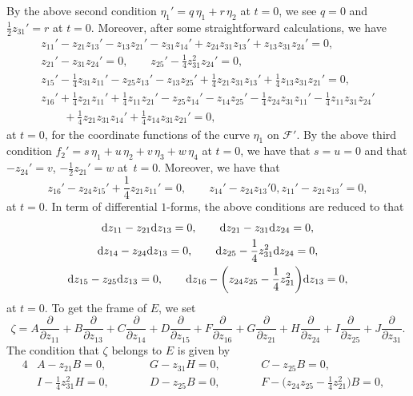 \documentclass[pdftex]{sigma}
\numberwithin{equation}{section}
\theoremstyle{definition}
\newcommand{\0}{\boldsymbol{0}}
\newcommand{\pa}{\partial}
\begin{document}
By the above second condition
$\eta_1' = q\,\eta_1 + r\,\eta_2$ at $t = 0$, we see $q = 0$ and $\frac{1}{2}z_{31}' = r$ at $t = 0$.
Moreover, after some straightforward calculations, we have
\begin{gather*}
z_{11}' - z_{21}z_{13}' - z_{13}z_{21}' - z_{31}z_{14}' + z_{24}z_{31}z_{13}' + z_{13}z_{31}z_{24}' = 0,
\\
z_{21}' - z_{31}z_{24}' = 0, \qquad z_{25}' - \frac{1}{4}z_{31}^2z_{24}' = 0,
\\
z_{15}' - \frac{1}{4}z_{31}z_{11}' - z_{25}z_{13}' - z_{13}z_{25}' + \frac{1}{4}z_{21}z_{31}z_{13}' +
\frac{1}{4}z_{13}z_{31}z_{21}' = 0,
\\
z_{16}' + \frac{1}{4}z_{21}z_{11}' + \frac{1}{4}z_{11}z_{21}' - z_{25}z_{14}' - z_{14}z_{25}' - \frac{1}{4}z_{24}z_{31}z_{11}' -
\frac{1}{4}z_{11}z_{31}z_{24}' \\
\qquad{} + \frac{1}{4}z_{21}z_{31}z_{14}' + \frac{1}{4}z_{14}z_{31}z_{21}' = 0,
\end{gather*}
at $t = 0$, for the coordinate functions of the curve $\eta_1$ on ${\mathcal F}'$.
By the above third condition
$f_2' = s\,\eta_1 + u\,\eta_2 + v\,\eta_3 + w\,\eta_4$ at $t = 0$, we have that
$s = u = 0$ and that $-z_{24}' = v$, $- \frac{1}{2}z_{21}' = w$ at~$t = 0$.
Moreover, we have that
\[
z_{16}' - z_{24}z_{15}' + \frac{1}{4}z_{21}z_{11}' = 0, \qquad z_{14}' - z_{24}z_{13}' 0, z_{11}' - z_{21}z_{13}' = 0,
\]
at $t = 0$.
In term of differential $1$-forms, the above conditions are reduced to that
\begin{gather*}
{\rm d}z_{11} - z_{21}{\rm d}z_{13} = 0, \qquad {\rm d}z_{21} - z_{31}{\rm d}z_{24} = 0, \\ {\rm d}z_{14} - z_{24}{\rm d}z_{13} = 0, \qquad
{\rm d}z_{25} - \frac{1}{4}z_{31}^2{\rm d}z_{24} = 0,
\\
{\rm d}z_{15} - z_{25}{\rm d}z_{13} = 0, \qquad {\rm d}z_{16} - \biggl(z_{24}z_{25} - \frac{1}{4}z_{21}^2\biggr){\rm d}z_{13} = 0,
\end{gather*}
at $t = 0$.
To get the frame of $E$, we set
\[
\zeta = A\frac{\pa}{\pa z_{11}} + B\frac{\pa}{\pa z_{13}} + C\frac{\pa}{\pa z_{14}} + D\frac{\pa}{\pa z_{15}} +
F\frac{\pa}{\pa z_{16}} + G\frac{\pa}{\pa z_{21}} + H\frac{\pa}{\pa z_{24}} + I\frac{\pa}{\pa z_{25}} + J\frac{\pa}{\pa z_{31}}.
\]
The condition that $\zeta$ belongs to $E$ is given by
\begin{alignat*}{4}
&A - z_{21}B = 0, \qquad&& G - z_{31}H = 0, \qquad&& C - z_{25}B = 0,& \\
&I - \frac{1}{4}z_{31}^2H = 0, \qquad&& D - z_{25}B = 0, \qquad&&
F - \biggl(z_{24}z_{25} - \frac{1}{4}z_{21}^2\biggr)B = 0,&
\end{alignat*}
\end{document}
